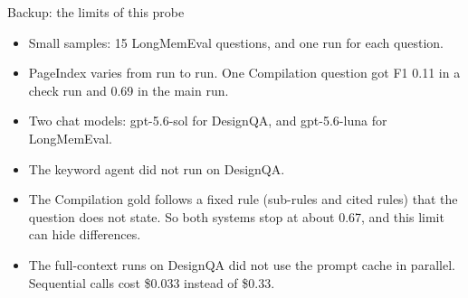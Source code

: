 \documentclass[aspectratio=169,11pt]{beamer}
\begin{document}
\begin{frame}{Backup: the limits of this probe}
  \vspace{0.20cm}
  {\fontsize{10.5}{14}\selectfont
  \begin{itemize}\setlength{\itemsep}{4pt}
    \item Small samples: 15 LongMemEval questions, and one run for each question.
    \item PageIndex varies from run to run. One Compilation question got F1 0.11 in a check run and 0.69 in the main run.
    \item Two chat models: gpt-5.6-sol for DesignQA, and gpt-5.6-luna for LongMemEval.
    \item The keyword agent did not run on DesignQA.
    \item The Compilation gold follows a fixed rule (sub-rules and cited rules) that the question does not state. So both systems stop at about 0.67, and this limit can hide differences.
    \item The full-context runs on DesignQA did not use the prompt cache in parallel. Sequential calls cost \$0.033 instead of \$0.33.
  \end{itemize}}
\end{frame}
\end{document}
